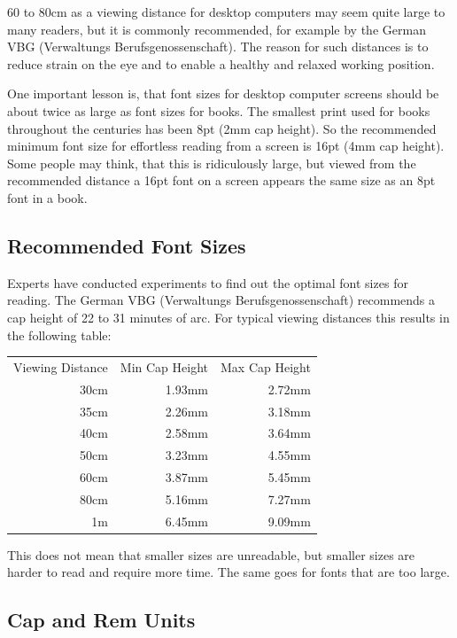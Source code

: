 60 to 80cm as a viewing distance for desktop computers may seem quite
large to many readers, but it is commonly recommended, for example by
the German VBG (Verwaltungs Berufsgenossenschaft). The reason for such
distances is to reduce strain on the eye and to enable a healthy and
relaxed working position.

One important lesson is, that font sizes for desktop computer screens
should be about twice as large as font sizes for books. The smallest
print used for books throughout the centuries has been 8pt (2mm cap
height). So the recommended minimum font size for effortless reading
from a screen is 16pt (4mm cap height). Some people may think, that this
is ridiculously large, but viewed from the recommended distance a 16pt
font on a screen appears the same size as an 8pt font in a book.

\subsection{Recommended Font Sizes}

Experts have conducted experiments to find out the optimal font sizes
for reading. The German VBG (Verwaltungs Berufsgenossenschaft)
recommends a cap height of 22 to 31 minutes of arc. For typical viewing
distances this results in the following table:

\vspace{1em}
\begin{tabular}{rrr}
Viewing Distance & Min Cap Height & Max Cap Height\\[0.5ex]
30cm & 1.93mm & 2.72mm\\
35cm & 2.26mm & 3.18mm\\
40cm & 2.58mm & 3.64mm\\
50cm & 3.23mm & 4.55mm\\
60cm & 3.87mm & 5.45mm\\
80cm & 5.16mm & 7.27mm\\
1m & 6.45mm & 9.09mm
\end{tabular}
\vspace{1em}

This does not mean that smaller sizes are unreadable, but smaller sizes
are harder to read and require more time. The same goes for fonts that
are too large.

\subsection{Cap and Rem Units}

